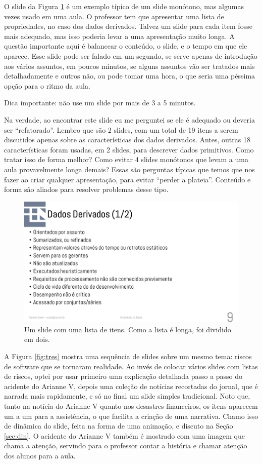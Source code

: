 O slide da Figura \ref{fig:dados} é um exemplo típico de um slide monótono, mas algumas vezes usado em uma aula. O professor tem que apresentar uma lista de propriedades, no caso dos dados derivados. Talvez um slide para cada item fosse mais adequado, mas isso poderia levar a uma apresentação muito longa. A questão importante aqui é balancear o conteúdo, o slide, e o tempo em que ele aparece. Esse slide pode ser falado em um segundo, se serve apenas de introdução aos vários assuntos, em poucos minutos, se alguns assuntos vão ser tratados mais detalhadamente e outros não, ou pode tomar uma hora, o que seria uma péssima opção para o ritmo da aula.

Dica importante: não use um slide por mais de 3 a 5 minutos.

Na verdade, ao encontrar este slide eu me perguntei se ele é adequado ou deveria ser ``refatorado''. Lembro que são 2 slides, com um total de 19 itens a serem discutidos apenas sobre as características dos dados derivados. Antes, outras 18 características foram usadas, em 2 slides, para descrever dados primitivos. Como tratar isso de forma melhor? Como evitar 4 slides monótonos que levam a uma aula provavelmente longa demais? Essas são perguntas típicas que temos que nos fazer ao criar qualquer apresentação, para evitar ``perder a plateia''. Conteúdo e forma são aliados para resolver problemas desse tipo.

\begin{figure}[tbh]
    \centering
    \includegraphics[width=\tam\linewidth,frame]{imagens/dados}
    \caption{Um slide com uma lista de itens. Como a lista é longa, foi dividido em dois.}
    \label{fig:dados}
\end{figure}


A Figura \ref{fig:tres} mostra uma sequência de slides sobre um mesmo tema: riscos de software que se tornaram realidade. Ao invés de colocar vários slides com listas de riscos, optei por usar primeiro uma explicação detalhada passo a passo do acidente do Arianne V, depois uma coleção de notícias recortadas do jornal, que é narrada mais rapidamente, e só no final um slide simples tradicional. Noto que, tanto na notícia do Arianne V quanto nos desastres financeiros, os itens aparecem um a um para a assistência, o que facilita a criação de uma narrativa. Chamo isso de dinâmica do slide, feita na forma de uma animação, e discuto na Seção \ref{sec:din}. O acidente do Arianne V também é mostrado com uma imagem que chama a atenção, servindo para o professor contar a história e chamar atenção dos alunos para a aula.

